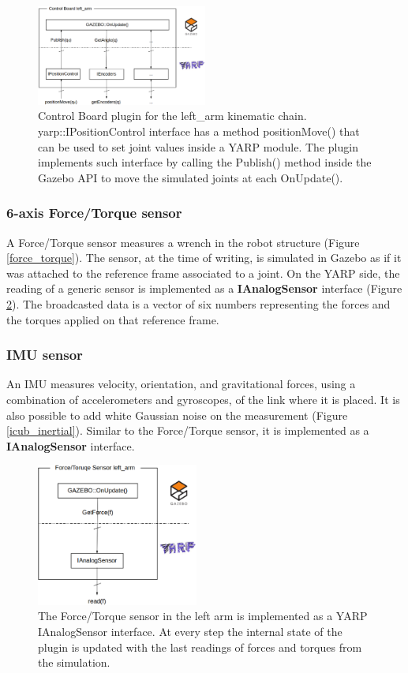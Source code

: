 \begin{figure}[h!]
  \centering
    \includegraphics[width=0.5\textwidth]{images/control_board.eps}
    \caption{Control Board plugin for the left\_arm kinematic chain. yarp::IPositionControl interface has a method positionMove() that can be used to set joint values inside a YARP module. The plugin implements such interface by calling the Publish() method inside the Gazebo API to move the simulated joints at each OnUpdate().}\label{control_board}
\end{figure}

\subsubsection{6-axis Force/Torque sensor}
A Force/Torque sensor measures a wrench in the robot structure (Figure \ref{force_torque}). The sensor, at the time of writing, is simulated in Gazebo as if it was attached to the reference frame associated to a joint. On the YARP side, the reading of a generic sensor is implemented as a \textbf{IAnalogSensor} interface (Figure \ref{ianalog_force_torque}). The broadcasted data is a vector of six numbers representing the forces and the torques applied on that reference frame.

\subsubsection{IMU sensor}
An IMU measures velocity, orientation, and gravitational forces, using a combination of accelerometers and gyroscopes, of the link where it is placed. It is also possible to add white Gaussian noise on the measurement (Figure \ref{icub_inertial}).
Similar to the Force/Torque sensor, it is implemented as a \textbf{IAnalogSensor} interface.

\begin{figure}[h!]
  \centering
    \includegraphics[width=0.475\textwidth]{images/ianalog_force_torque.eps}
    \caption{The Force/Torque sensor in the left arm is implemented as a YARP IAnalogSensor interface. At every step the internal state of the plugin is updated with the last readings of forces and torques from the simulation.}\label{ianalog_force_torque}
\end{figure}

